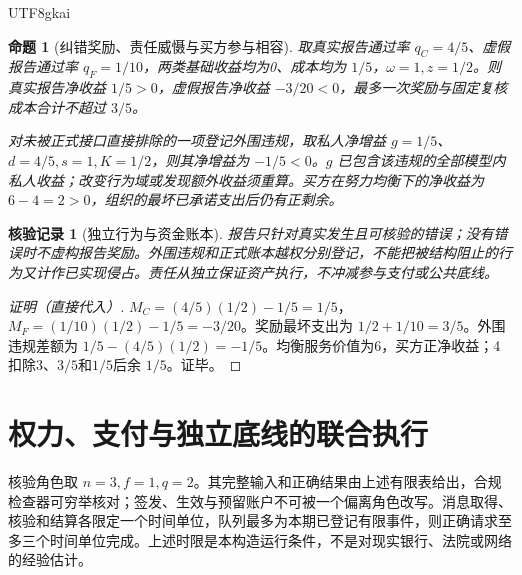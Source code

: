 \documentclass[12pt,a4paper,openany]{report}
\newtheorem{proposition}{命题}[chapter]
\newtheorem{Certificate}{核验记录}[chapter]
\begin{document}
\begin{CJK*}{UTF8}{gkai}
\begin{proposition}[纠错奖励、责任威慑与买方参与相容]
\label{prop:example-incentives}
取真实报告通过率 $q_C=4/5$、虚假报告通过率 $q_F=1/10$，两类基础收益均为0、成本均为 $1/5$，$\omega=1,z=1/2$。则真实报告净收益 $1/5>0$，虚假报告净收益 $-3/20<0$，最多一次奖励与固定复核成本合计不超过 $3/5$。

对未被正式接口直接排除的一项登记外围违规，取私人净增益 $g=1/5$、$d=4/5,s=1,K=1/2$，则其净增益为 $-1/5<0$。$g$ 已包含该违规的全部模型内私人收益；改变行为域或发现额外收益须重算。买方在努力均衡下的净收益为 $6-4=2>0$，组织的最坏已承诺支出后仍有正剩余。
\end{proposition}
\begin{Certificate}[独立行为与资金账本]
报告只针对真实发生且可核验的错误；没有错误时不虚构报告奖励。外围违规和正式账本越权分别登记，不能把被结构阻止的行为又计作已实现侵占。责任从独立保证资产执行，不冲减参与支付或公共底线。
\end{Certificate}
\begin{proof}[证明（直接代入）]
$M_C=(4/5)(1/2)-1/5=1/5$，$M_F=(1/10)(1/2)-1/5=-3/20$。奖励最坏支出为 $1/2+1/10=3/5$。外围违规差额为 $1/5-(4/5)(1/2)=-1/5$。均衡服务价值为6，买方正净收益；4扣除3、$3/5$和$1/5$后余 $1/5$。证毕。
\end{proof}

\section{权力、支付与独立底线的联合执行}
核验角色取 $n=3,f=1,q=2$。其完整输入和正确结果由上述有限表给出，合规检查器可穷举核对；签发、生效与预留账户不可被一个偏离角色改写。消息取得、核验和结算各限定一个时间单位，队列最多为本期已登记有限事件，则正确请求至多三个时间单位完成。上述时限是本构造运行条件，不是对现实银行、法院或网络的经验估计。


\end{CJK*}
\end{document}
